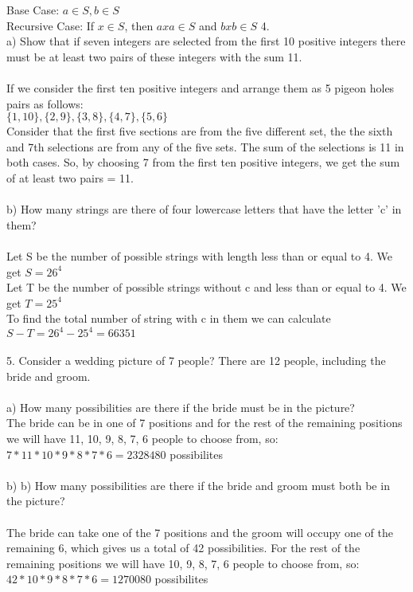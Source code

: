 \documentclass[11pt, oneside]{article}   	%
\begin{document}
Base Case: $a\in S, b\in S$\\
Recursive Case: If $x\in S$, then $axa\in S$ and $bxb\in S$
4. \\
a) Show that if seven integers are selected from the first 10 positive integers there must be at least two pairs of these integers with the sum 11.\\\\
If we consider the first ten positive integers and arrange them as 5 pigeon holes pairs as follows:\\
$\{1,10\}, \{2,9\}, \{3,8\}, \{4,7\}, \{5,6\}$\\
Consider that the first five sections are from the five different set, the the sixth and 7th selections are from any of the five sets. The sum of the selections is 11 in both cases.  So, by choosing 7 from the first ten positive integers, we get the sum of at least two pairs = 11. \\\\
b) How many strings are there of four lowercase letters that have the letter 'c' in them?\\\\
Let S be the number of possible strings with length less than or equal to 4. We get $S = 26^4$\\
Let T be the number of possible strings without c and less than or equal to 4. We get $T = 25^4$\\
To find the total number of string with c in them we can calculate $S - T = 26^4 - 25^4 = 66351$\\\\
5. Consider a wedding picture of 7 people? There are 12 people, including the bride and groom. \\\\
a) How many possibilities are there if the bride must be in the picture?\\
The bride can be in one of 7 positions and for the rest of the remaining positions we will have 11, 10, 9, 8, 7, 6 people to choose from, so:\\
$ 7 * 11 * 10 * 9 * 8 * 7 * 6 = 2328480$ possibilites\\\\
b) b) How many possibilities are there if the bride and groom must both be in the picture?\\\\
The bride can take one of the 7 positions and the groom will occupy one of the remaining 6, which gives us a total of 42 possibilities. For the rest of the remaining positions we will have 10, 9, 8, 7, 6 people to choose from, so:\\
$42 * 10 * 9 * 8 * 7 * 6 = 1270080$ possibilites\\
\end{document}
